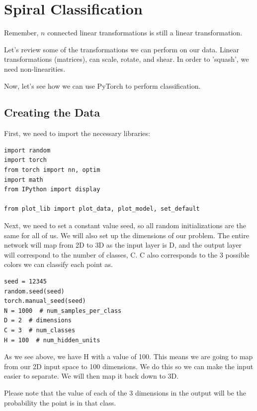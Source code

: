 \chapter{Spiral Classification}

Remember, $n$ connected linear transformations is still a linear transformation.

Let's review some of the transformations we can perform on our data. 
Linear transformations (matrices), can scale, rotate, and shear. 
In order to 'squash', we need non-linearities. 

Now, let's see how we can use PyTorch to perform classification. 

\section{Creating the Data}

First, we need to import the necessary libraries:

\begin{verbatim}
import random
import torch
from torch import nn, optim
import math
from IPython import display

from plot_lib import plot_data, plot_model, set_default
\end{verbatim}

Next, we need to set a constant value seed, so all random initializations are the same for all of us. 
We will also set up the dimensions of our problem. 
The entire network will map from 2D to 3D as the input layer is D, and the output layer will correspond to the number of classes, C. 
C also corresponds to the 3 possible colors we can classify each point as. 

\begin{verbatim}
seed = 12345
random.seed(seed)
torch.manual_seed(seed)
N = 1000  # num_samples_per_class
D = 2  # dimensions
C = 3  # num_classes
H = 100  # num_hidden_units
\end{verbatim}

As we see above, we have H with a value of 100. 
This means we are going to map from our 2D input space to 100 dimensions. 
We do this so we can make the input easier to separate. 
We will then map it back down to 3D. 

Please note that the value of each of the 3 dimensions in the output will be the probability the point is in that class. 

